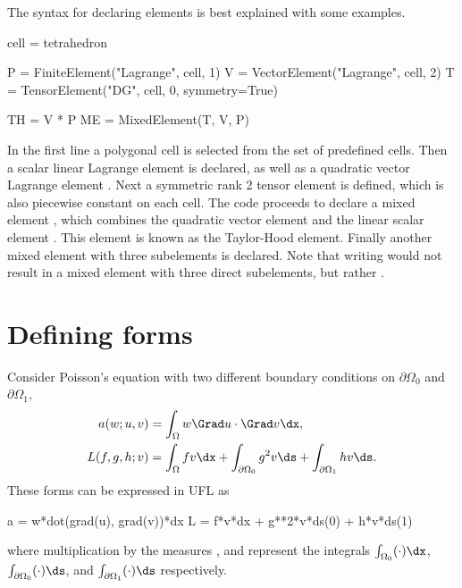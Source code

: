 The syntax for declaring elements is best explained with some
examples.
\begin{python}
cell = tetrahedron

P = FiniteElement("Lagrange", cell, 1)
V = VectorElement("Lagrange", cell, 2)
T = TensorElement("DG", cell, 0, symmetry=True)

TH = V * P
ME = MixedElement(T, V, P)
\end{python}
In the first line a polygonal cell is selected from the set of
predefined cells.  Then a scalar linear Lagrange element  is
declared, as well as a quadratic vector Lagrange element .
Next a symmetric rank 2 tensor element  is defined, which is
also piecewise constant on each cell. The code proceeds to declare a
mixed element , which combines the quadratic vector element
 and the linear scalar element . This element is known
as the Taylor-Hood element.  Finally another mixed element with three
subelements is declared. Note that writing  would not
result in a mixed element with three direct subelements, but rather
.

\section{Defining forms}
\label{ufl:sec:forms}

Consider Poisson's equation with two different boundary
conditions on $\partial\Omega_0$ and $\partial\Omega_1$,
\begin{align}
a(w; u, v) &= \int_\Omega w \Grad u \cdot \Grad v \dx, \\
L(f, g, h; v) &= \int_\Omega f v \dx + \int_{\partial\Omega_0} g^2 v \ds + \int_{\partial\Omega_1} h v \ds.
\end{align}
These forms can be expressed in UFL as
\begin{python}
a = w*dot(grad(u), grad(v))*dx
L = f*v*dx + g**2*v*ds(0) + h*v*ds(1)
\end{python}
where multiplication by the measures ,  and 
represent the integrals $\int_{\Omega_0} (\cdot) \dx$,
$\int_{\partial\Omega_0} (\cdot) \ds$,
and $\int_{\partial\Omega_1} (\cdot) \ds$
respectively.

